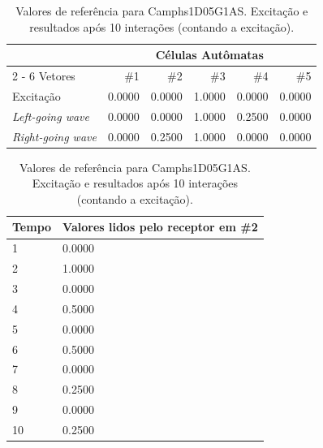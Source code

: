 \begin{table}[h]
\caption{\label{tab:refaxistream} Valores de referência para Camphs1D05G1AS. Excitação e resultados após 10 interações (contando a excitação).}
\begin{center}
\begin{tabular}{| l | r | r | r | r | r |}
\hline
& \multicolumn{5}{c|}{Células Autômatas}\\
\cline{2 - 6} %
Vetores & \#1 & \#2 & \#3 & \#4 & \#5 \\
\hline
Excitação & 0{.}0000 & 0{.}0000 & 1{.}0000 & 0{.}0000 & 0{.}0000 \\
\textit{Left-going wave} & 0{.}0000 & 0{.}0000 & 1{.}0000 & 0{.}2500 & 0{.}0000 \\
\textit{Right-going wave} & 0{.}0000 & 0{.}2500 & 1{.}0000 & 0{.}0000 & 0{.}0000 \\
\hline
\end{tabular}
\end{center}
\centering
\begin{tabular}{ |p{2cm}|p{7cm}|  }
\hline
Tempo & Valores lidos pelo receptor em \#2 \\
\hline
1 & 0{.}0000 \\
 \hline
2 & 1{.}0000 \\
 \hline
3 & 0{.}0000 \\
 \hline
4 & 0{.}5000 \\
 \hline
5 & 0{.}0000 \\
 \hline
6 & 0{.}5000 \\
 \hline
7 & 0{.}0000 \\
 \hline
8 & 0{.}2500 \\
 \hline
9 & 0{.}0000 \\
 \hline
10 & 0{.}2500 \\
 \hline
\end{tabular}
\end{table}